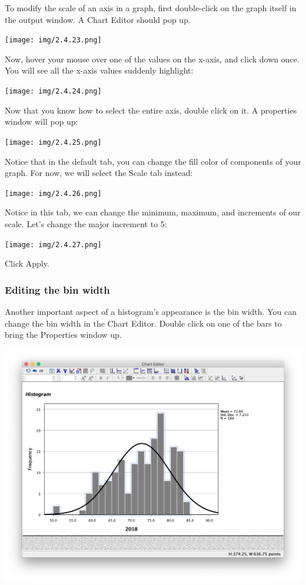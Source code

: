 \documentclass[
]{book}
\begin{document}
To modify the scale of an axis in a graph, first {double-click} on the graph itself in the output window. A Chart Editor should pop up.

\texttt{[image: img/2.4.23.png]}

Now, hover your mouse over one of the values on the x-axis, and click down once. You will see all the x-axis values suddenly highlight:

\texttt{[image: img/2.4.24.png]}

Now that you know how to select the entire axis, {double click} on it. A properties window will pop up:

\texttt{[image: img/2.4.25.png]}

Notice that in the default tab, you can change the fill color of components of your graph. For now, we will select the {Scale} tab instead:

\texttt{[image: img/2.4.26.png]}

Notice in this tab, we can change the minimum, maximum, and increments of our scale. Let's change the major increment to 5:

\texttt{[image: img/2.4.27.png]}

Click {Apply}.

\hypertarget{editing-the-bin-width}{%
\subsubsection{Editing the bin width}\label{editing-the-bin-width}}

Another important aspect of a histogram's appearance is the bin width. You can change the bin width in the Chart Editor. Double click on one of the bars to bring the Properties window up.

\includegraphics{img/2.4.28.png}
\end{document}
